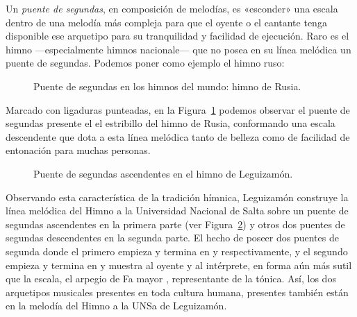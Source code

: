 Un \emph{puente de segundas}, en composición de melodías, es «esconder» una escala dentro de una melodía más compleja para que el oyente o el cantante tenga disponible ese arquetipo para su tranquilidad y facilidad de ejecución. Raro es el himno ---especialmente himnos nacionale--- que no posea en su línea melódica un puente de segundas. Podemos poner como ejemplo el himno ruso:

\begin{figure}[H]
\caption{Puente de segundas en los himnos del mundo: himno de Rusia.}
\label{fig:himno-ruso}
\end{figure}

Marcado con ligaduras punteadas, en la Figura~\ref{fig:himno-ruso} podemos observar el puente de segundas presente el el estribillo del himno de Rusia, conformando una escala descendente  que dota a esta línea melódica tanto de belleza como de facilidad de entonación para muchas personas.

\begin{figure}[H]
\caption{Puente de segundas ascendentes en el himno de Leguizamón.}
\label{fig:segundas-ascendentes-himno}
\end{figure}

Observando esta característica de la tradición hímnica, Leguizamón construye la línea melódica del Himno a la Universidad Nacional de Salta sobre un puente de segundas ascendentes  en la primera parte (ver Figura~\ref{fig:segundas-ascendentes-himno}) y otros dos puentes de segundas descendentes  en la segunda parte. El hecho de poseer dos puentes de segunda donde el primero empieza y termina en  y  respectivamente, y el segundo empieza y termina en  y  muestra al oyente y al intérprete, en forma aún más sutil que la escala, el arpegio de Fa mayor \hbox{,} representante de la tónica. Así, los dos arquetipos musicales presentes en toda cultura humana, presentes también están en la melodía del Himno a la UNSa de Leguizamón.

